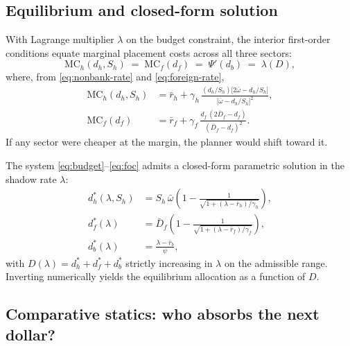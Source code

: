 \documentclass[\latexroot/\projectname]{subfiles}
\begin{document}
\subsection{Equilibrium and closed-form solution}

With Lagrange multiplier $\lambda$ on the budget constraint, the
interior first-order conditions equate marginal placement costs across
all three sectors:
\begin{equation}\label{eq:foc}
  \text{MC}_h(d_h,S_h) \;=\; \text{MC}_f(d_f) \;=\; \Psi'(d_b)
  \;=\; \lambda(D),
\end{equation}
where, from \eqref{eq:nonbank-rate} and \eqref{eq:foreign-rate},
\begin{align}
  \text{MC}_h(d_h,S_h)
    &= \bar r_h + \gamma_h\,
      \frac{(d_h/S_h)\!\bigl[2\bar\omega - d_h/S_h\bigr]}
            {\bigl[\bar\omega - d_h/S_h\bigr]^{2}},
      \label{eq:MCh}\\
  \text{MC}_f(d_f)
    &= \bar r_f + \gamma_f\,
      \frac{d_f\,(2\bar D_f - d_f)}{(\bar D_f - d_f)^{2}}.
      \label{eq:MCf}
\end{align}
If any sector were cheaper at the margin, the planner would shift
toward it.

The system \eqref{eq:budget}--\eqref{eq:foc} admits a closed-form
parametric solution in the shadow rate $\lambda$:
\begin{align}
  d_h^\ast(\lambda,S_h)
    &= S_h\,\bar\omega\!\left(1 - \frac{1}{\sqrt{1+(\lambda-\bar r_h)/\gamma_h}}\right),
      \label{eq:dhstar}\\
  d_f^\ast(\lambda)
    &= \bar D_f\!\left(1 - \frac{1}{\sqrt{1+(\lambda-\bar r_f)/\gamma_f}}\right),
      \label{eq:dfstar}\\
  d_b^\ast(\lambda) &= \frac{\lambda-\bar r_b}{\psi},
      \label{eq:dbstar}
\end{align}
with $D(\lambda)=d_h^\ast+d_f^\ast+d_b^\ast$ strictly increasing in
$\lambda$ on the admissible range. Inverting numerically yields the
equilibrium allocation as a function of $D$.

\subsection{Comparative statics: who absorbs the next dollar?}
\end{document}
